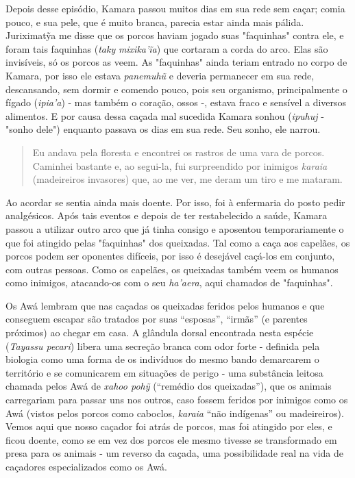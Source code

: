 Depois desse episódio, Kamara passou muitos dias em sua rede sem caçar;
comia pouco, e sua pele, que é muito branca, parecia estar ainda mais
pálida. Juriximatỹa me disse que os porcos haviam jogado suas
"faquinhas" contra ele, e foram tais faquinhas (\emph{taky}
\emph{mixika'ĩa}) que cortaram a corda do arco. Elas são invisíveis, só
os porcos as veem. As "faquinhas" ainda teriam entrado no corpo de
Kamara, por isso ele estava \emph{panemuhũ} e deveria permanecer em sua
rede, descansando, sem dormir e comendo pouco, pois seu organismo,
principalmente o fígado (\emph{ipia'a}) - mas também o coração, ossos -,
estava fraco e sensível a diversos alimentos. E por causa dessa caçada
mal sucedida Kamara sonhou (\emph{ipuhuj} - "sonho dele") enquanto
passava os dias em sua rede. Seu sonho, ele narrou.

\begin{quote}
Eu andava pela floresta e encontrei os rastros de uma vara de porcos.
Caminhei bastante e, ao segui-la, fui surpreendido por inimigos
\emph{karaia} (madeireiros invasores) que, ao me ver, me deram um tiro e
me mataram.
\end{quote}

Ao acordar se sentia ainda mais doente. Por isso, foi à enfermaria do
posto pedir analgésicos. Após tais eventos e depois de ter restabelecido
a saúde, Kamara passou a utilizar outro arco que já tinha consigo e
aposentou temporariamente o que foi atingido pelas "faquinhas" dos
queixadas. Tal como a caça aos capelães, os porcos podem ser oponentes
difíceis, por isso é desejável caçá-los em conjunto, com outras pessoas.
Como os capelães, os queixadas também veem os humanos como inimigos,
atacando-os com o seu \emph{ha'aera}, aqui chamados de "faquinhas".

Os Awá lembram que nas caçadas os queixadas feridos pelos humanos e que
conseguem escapar são tratados por suas ``esposas'', ``irmãs'' (e
parentes próximos) ao chegar em casa. A glândula dorsal encontrada nesta
espécie (\emph{Tayassu pecari}) libera uma secreção branca com odor
forte - definida pela biologia como uma forma de os indivíduos do mesmo
bando demarcarem o território e se comunicarem em situações de perigo -
uma substância leitosa chamada pelos Awá de \emph{xahoo pohỹ} (``remédio
dos queixadas''), que os animais carregariam para passar uns nos outros,
caso fossem feridos por inimigos como os Awá (vistos pelos porcos como
caboclos, \emph{karaia} ``não indígenas'' ou madeireiros). Vemos aqui
que nosso caçador foi atrás de porcos, mas foi atingido por eles, e
ficou doente, como se em vez dos porcos ele mesmo tivesse se
transformado em presa para os animais - um reverso da caçada, uma
possibilidade real na vida de caçadores especializados como os Awá.

